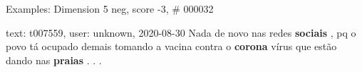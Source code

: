 \begin{frame}{Examples: Dimension 5 neg, score -3, \# 000032}
\footnotesize
\begin{alertblock}{text: t007559, user: unknown, 2020-08-30}
Nada de novo nas redes \textbf{sociais} , pq o povo tá ocupado demais tomando a 
vacina contra o \textbf{corona} vírus que estão dando nas \textbf{praias} . . . 
\end{alertblock}
\end{frame}
